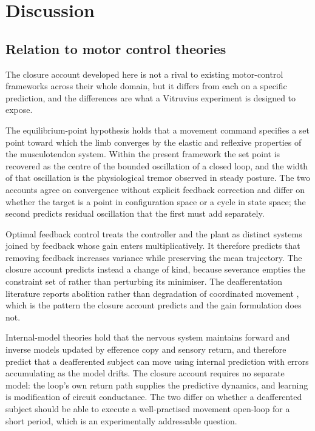 \documentclass[11pt,twocolumn,a4paper]{article}
\theoremstyle{thmstyle}
\theoremstyle{definition}
\theoremstyle{remark}
\begin{document}
\section{Discussion}
\label{sec:discussion}

\subsection{Relation to motor control theories}

The closure account developed here is not a rival to existing motor-control
frameworks across their whole domain, but it differs from each on a specific
prediction, and the differences are what a Vitruvius experiment is designed to
expose.

The equilibrium-point hypothesis \citep{feldman1986} holds that a movement
command specifies a set point toward which the limb converges by the elastic
and reflexive properties of the musculotendon system. Within the present
framework the set point is recovered as the centre of the bounded oscillation
of a closed loop, and the width of that oscillation is the physiological
tremor observed in steady posture. The two accounts agree on convergence
without explicit feedback correction and differ on whether the target is a
point in configuration space or a cycle in state space; the second predicts
residual oscillation that the first must add separately.

Optimal feedback control \citep{todorov2002} treats the controller and the
plant as distinct systems joined by feedback whose gain enters
multiplicatively. It therefore predicts that removing feedback increases
variance while preserving the mean trajectory. The closure account predicts
instead a change of kind, because severance empties the constraint set of
 rather than perturbing its minimiser. The
deafferentation literature reports abolition rather than degradation of
coordinated movement \citep{cole1991,sainburg1995,ghez1995,lajoie1996}, which
is the pattern the closure account predicts and the gain formulation does not.

Internal-model theories \citep{kawato1999,wolpert2000} hold that the nervous
system maintains forward and inverse models updated by efference copy and
sensory return, and therefore predict that a deafferented subject can move
using internal prediction with errors accumulating as the model drifts. The
closure account requires no separate model: the loop's own return path
supplies the predictive dynamics, and learning is modification of circuit
conductance. The two differ on whether a deafferented subject should be able
to execute a well-practised movement open-loop for a short period, which is an
experimentally addressable question.
\end{document}
